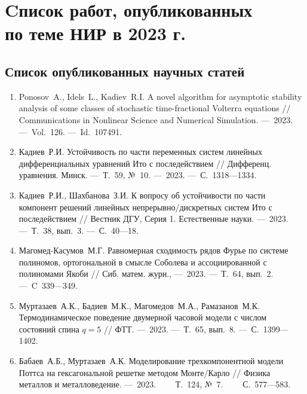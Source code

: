 \chapter{Cписок работ, опубликованных \texorpdfstring{\\ }{} по теме НИР в 2023 г.}


\section*{Список опубликованных научных статей}

\begin{enumerate}

    \item
    \foreignlanguage{english}{%
        Ponosov~A., Idels~L., Kadiev~R.I.
        A novel algorithm for asymptotic stability analysis of some classes of stochastic time-fractional Volterra equations
        //
        Communications in Nonlinear Science and Numerical Simulation. 
        ---~2023.
        ---~Vol.~126.
        ---~Id.~107491.
    }

    \item 
    Кадиев~Р.И. 
    Устойчивость по части переменных систем линейных дифференциальных уравнений Ито с последействием 
    //
    Дифференц. уравнения. Минск. 
    ---~Т.~59, №~10.
    ---~2023. 
    ---~С.~1318---1334.

    \item 
    Кадиев~Р.И., Шахбанова~З.И. 
    К вопросу об устойчивости по части компонент решений линейных непрерывно\-/дискретных систем Ито с последействием 
    // 
    Вестник ДГУ, Серия 1. Естественные науки. 
    ---~2023.
    ---~Т.~38, вып.~3.
    ---~С.~40---18.

    \item
    Магомед-Касумов~М.Г. 
    Равномерная сходимость рядов Фурье по системе полиномов, ортогональной в смысле Соболева и ассоциированной с полиномами Якоби 
    // 
    Сиб. матем. журн., 
    ---~2023.
    ---~Т.~64, вып.~2.
    ---~C~339---349.

    \item
    Муртазаев~А.К., Бадиев~М.К., Магомедов~М.А., Рамазанов~М.К. 
    Термодинамическое поведение двумерной часовой модели с числом состояний спина $q = 5$ 
    // 
    ФТТ.
    ---~2023.
    ---~Т.~65, вып.~8.
    ---~С.~1399---1402.

    \item
    Бабаев~А.Б., Муртазаев~А.К. 
    Моделирование трехкомпонентной модели Поттса на гексагональной решетке методом Монте\-/Карло 
    // 
    Физика металлов и металловедение. 
    ---~2023.
    ~~~~Т.~124, №~7.
    ~~~~С.~577---583.


\end{enumerate}
